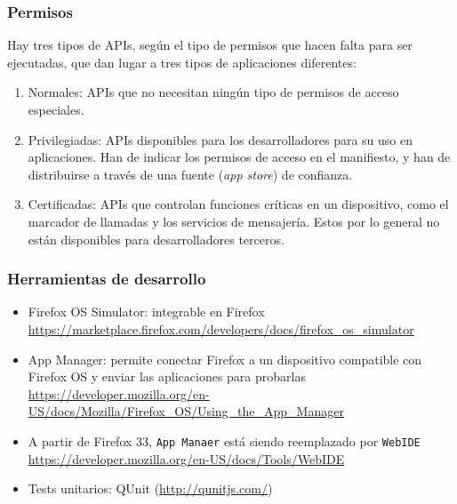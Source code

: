 
\begin{frame}
\frametitle{Permisos}

Hay tres tipos de APIs, según el tipo de permisos que hacen falta para ser ejecutadas, que
dan lugar a tres tipos de aplicaciones diferentes:

\begin{enumerate}
   \item Normales: APIs que no necesitan ningún tipo de permisos de acceso especiales.
   \item Privilegiadas: APIs disponibles para los desarrolladores para su uso en aplicaciones. Han de indicar los permisos de acceso en el manifiesto, y han de distribuirse a través de una fuente (\emph{app store}) de confianza.
   \item Certificadas: APIs que controlan funciones críticas en un dispositivo, como el marcador de llamadas y los servicios de mensajería. Estos por lo general no están disponibles para desarrolladores terceros.
\end{enumerate}

\end{frame}



\begin{frame}
\frametitle{Herramientas de desarrollo}

\begin{itemize}
  \item Firefox OS Simulator: integrable en Firefox \\
    \url{https://marketplace.firefox.com/developers/docs/firefox_os_simulator}
  \item App Manager: permite conectar Firefox a un dispositivo compatible con Firefox OS y enviar las aplicaciones para probarlas \\  
     \url{https://developer.mozilla.org/en-US/docs/Mozilla/Firefox_OS/Using_the_App_Manager}
  \item A partir de Firefox 33, \texttt{App Manaer} está siendo reemplazado por \texttt{WebIDE} \\
    \url{https://developer.mozilla.org/en-US/docs/Tools/WebIDE}
  \item Tests unitarios: QUnit (\url{http://qunitjs.com/})
\end{itemize}

\end{frame}



